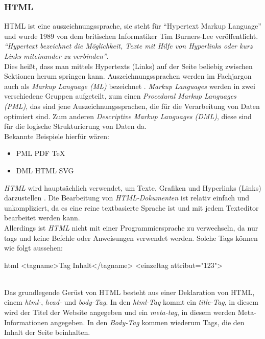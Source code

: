 		\subsubsection{HTML}
		HTML ist eine \Gls{auszeichnungssprache}, sie steht für \enquote{Hypertext Markup Language} und wurde 1989 von dem britischen Informatiker Tim Burners-Lee veröffentlicht.\\ 
		\textit{\enquote{Hypertext bezeichnet die Möglichkeit, Texte mit Hilfe von Hyperlinks oder kurz Links miteinander zu verbinden}}\cite{html5-css3-def}.\\ 
		Dies heißt, dass man mittels Hypertexts (Links) auf der Seite beliebig zwischen Sektionen herum springen kann.
		Auszeichnungssprachen werden im Fachjargon auch als \textit{Markup Language (ML)} bezeichnet \cite{auszeichnungssprachen}. \textit{Markup Languages} werden in zwei verschiedene Gruppen aufgeteilt, zum einen \textit{Procedural Markup Languages (PML)}, das sind jene Auszeichnungssprachen, die für die Verarbeitung von Daten optimiert sind. Zum anderen \textit{Descriptive Markup Languages (DML)}, diese sind für die logische Strukturierung von Daten da.\\Bekannte Beispiele hierfür wären:
		\begin{itemize}
		\item PML
		\subitem PDF
		\subitem TeX
		\item DML
		\subitem HTML
		\subitem SVG
		\end{itemize}
		\textit{HTML} wird hauptsächlich verwendet, um Texte, Grafiken und Hyperlinks (Links) darzustellen \cite{html5-css3-handbuch, html5-css3-def}. Die Bearbeitung von \textit{HTML-Dokumenten} ist relativ einfach und unkompliziert, da es eine reine textbasierte Sprache ist und mit jedem Texteditor bearbeitet werden kann.\\
		Allerdings ist \textit{HTML} nicht mit einer Programmiersprache zu verwechseln, da nur \Gls{tag}s und keine Befehle oder Anweisungen verwendet werden. Solche Tags können wie folgt aussehen:
		\begin{code}{html}
			<tagname>Tag Inhalt</tagname>
			<einzeltag attribut="123">
		\end{code}
	\label{list:htmltags} ~\\
		Das grundlegende Gerüst von HTML besteht aus einer Deklaration von HTML, einem \textit{html-}, \textit{head-} und \textit{body-Tag}. In den \textit{html-Tag} kommt ein \textit{title-Tag}, in diesem wird der Titel der Website angegeben und ein \textit{meta-tag}, in diesem werden Meta-Informationen angegeben. In den \textit{Body-Tag} kommen wiederum Tags, die den Inhalt der Seite beinhalten. 

